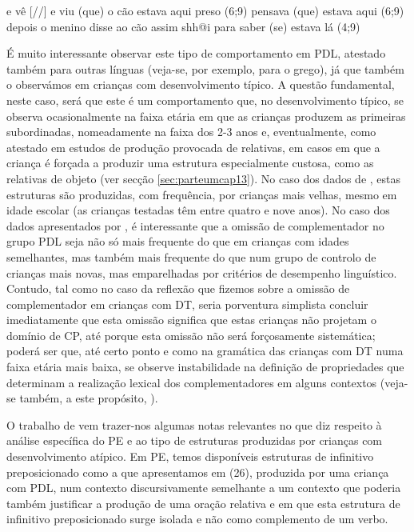 \documentclass[output=paper,colorlinks,citecolor=brown,booklanguage=portuguese]{langscibook}
\begin{document}
\ea
    \label{ex:13:23}  e vê [//] e viu (que) o cão estava aqui preso (6;9)
    \z
    \ea
\label{ex:13:24} pensava (que) estava aqui	(6;9)
\z
\ea
\label{ex:13:25} depois o menino disse ao cão assim shh@i para saber (se) estava lá    (4;9)
\z

É muito interessante observar este tipo de comportamento em PDL, atestado também para outras línguas (veja-se, por exemplo, \citealp{Mastropavlou2011} para o grego), já que também o observámos em crianças com desenvolvimento típico. A questão fundamental, neste caso, será que este é um comportamento que, no desenvolvimento típico, se observa ocasionalmente na faixa etária em que as crianças produzem as primeiras subordinadas, nomeadamente na faixa dos 2-3 anos e, eventualmente, como atestado em estudos de produção provocada de relativas, em casos em que a criança é forçada a produzir uma estrutura especialmente custosa, como as relativas de objeto (ver secção \ref{sec:parteumcap13}). No caso dos dados de \citeauthor{SuaKay19971998}, estas estruturas são produzidas, com frequência, por crianças mais velhas, mesmo em idade escolar (as crianças testadas têm entre quatro e nove anos). No caso dos dados apresentados por \citet{Mastropavlou2011}, é interessante que a omissão de complementador no grupo PDL seja não só mais frequente do que em crianças com idades semelhantes, mas também mais frequente do que num grupo de controlo de crianças mais novas, mas emparelhadas por critérios de desempenho linguístico. Contudo, tal como no caso da reflexão que fizemos sobre a omissão de complementador em crianças com DT, seria porventura simplista concluir imediatamente que esta omissão significa que estas crianças não projetam o domínio de CP, até porque esta omissão não será forçosamente sistemática; poderá ser que, até certo ponto e como na gramática das crianças com DT numa faixa etária mais baixa, se observe instabilidade na definição de propriedades que determinam a realização lexical dos complementadores em alguns contextos (veja-se também, a este propósito, \citealp{Mastropavlou2011}).

O trabalho de \citet{Martinsempreparacao} vem trazer-nos algumas notas relevantes no que diz respeito à análise específica do PE e ao tipo de estruturas produzidas por crianças com desenvolvimento atípico. Em PE, temos disponíveis estruturas de infinitivo preposicionado como a que apresentamos em (26), produzida por uma criança com PDL, num contexto discursivamente semelhante a um contexto que poderia também justificar a produção de uma oração relativa e em que esta estrutura de infinitivo preposicionado surge isolada e não como complemento de um verbo. 
\end{document}
